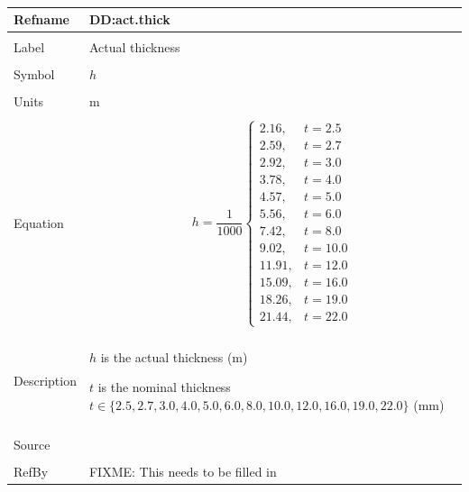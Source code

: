 \documentclass[12pt]{article}
\begin{document}
~\newline
\noindent \begin{minipage}{\textwidth}
\begin{tabular}{p{} p{}}
\toprule \textbf{Refname} & \textbf{DD:act.thick}
\label{DD:act.thick}
\\ \midrule \\
Label & Actual thickness
\\ \midrule \\
Symbol & $h$
\\ \midrule \\
Units & m
\\ \midrule \\
Equation & \begin{dmath}
           h=\frac{1}{1000} \begin{cases}
2.16, & t=2.5\\
2.59, & t=2.7\\
2.92, & t=3.0\\
3.78, & t=4.0\\
4.57, & t=5.0\\
5.56, & t=6.0\\
7.42, & t=8.0\\
9.02, & t=10.0\\
11.91, & t=12.0\\
15.09, & t=16.0\\
18.26, & t=19.0\\
21.44, & t=22.0
\end{cases}
           \end{dmath}
\\ \midrule \\
Description & \begin{description}
              \item{$h$ is the actual thickness (m)}
              \item{$t$ is the nominal thickness $t\in{}\{2.5,2.7,3.0,4.0,5.0,6.0,8.0,10.0,12.0,16.0,19.0,22.0\}$ (mm)}
              \end{description}
\\ \midrule \\
Source & 
\\ \midrule \\
RefBy & FIXME: This needs to be filled in
\\ \bottomrule \end{tabular}
\end{minipage}\\
~\newline
\end{document}
